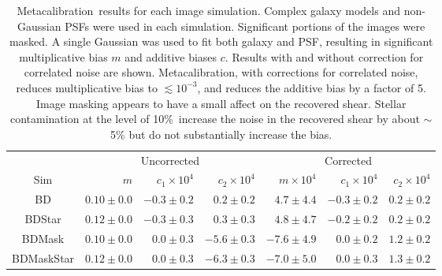 \documentclass[usegraphicx,usenatbib]{mn2e}
\newcommand{\Mcal}{Metacalibration}
\newcommand{\nsimNstarperc}{10\%}
\begin{document}
\begin{table}
    \centering
    \caption{\Mcal\ results for each image simulation.  Complex galaxy models
        and non-Gaussian PSFs were used in each simulation.  Significant
        portions of the images were masked.  A single Gaussian was used
    to fit both galaxy and PSF, resulting in significant multiplicative 
    bias $m$ and additive biases $c$.  Results with and without correction
    for correlated noise are shown.  \Mcal, with corrections for correlated noise,
    reduces multiplicative bias to $\lesssim 10^{-3}$, and reduces the additive
    bias by a factor of 5.  Image masking appears to have a small affect on the
    recovered shear.  Stellar contamination at the level of \nsimNstarperc\ increase
    the noise in the recovered shear by about $\sim$5\% but do not substantially
    increase the bias.  \label{tab:results}}
    \begin{tabular}{ |c|  r|r|r|  r|r|r|}
        \hline
        & \multicolumn{3}{c}{Uncorrected} & \multicolumn{3}{c}{Corrected} \\
    Sim & $m$ & $c_1 \times 10^4$ & $c_2 \times 10^4$ & $m \times 10^{4}$ & $c_1 \times 10^4$ & $c_2 \times 10^4$ \\
        \hline
        BD              & $0.10 \pm 0.0$ & $-0.3 \pm 0.2$ & $0.2 \pm 0.2$ & $ 4.7 \pm 4.4$ & $-0.3 \pm 0.2$ & $0.2 \pm 0.2$  \\
        BDStar          & $0.12 \pm 0.0$ & $-0.3 \pm 0.3$ & $0.3 \pm 0.3$ & $ 4.8 \pm 4.7$ & $-0.2 \pm 0.2$ & $0.2 \pm 0.2$  \\
        BDMask          & $0.10 \pm 0.0$ & $0.0 \pm 0.3$ & $-5.6 \pm 0.3$ & $-7.6 \pm 4.9$ & $0.0 \pm 0.2$ & $1.2 \pm 0.2$  \\
        BDMaskStar      & $0.12 \pm 0.0$ & $0.0 \pm 0.3$ & $-6.3 \pm 0.3$ & $-7.0 \pm 5.0$ & $0.0 \pm 0.3$ & $1.3 \pm 0.2$  \\
    \end{tabular}
\end{table}
\end{document}
